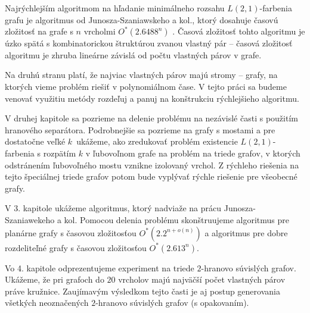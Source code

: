 Najrýchlejším algoritmom na hľadanie minimálneho rozsahu $L(2,1)$-farbenia grafu
je algoritmus od Junosza-Szaniawskeho a kol., ktorý dosahuje časovú zložitosť
na grafe s $n$ vrcholmi $O^*(2.6488^n)$ \cite{junosza_fast}. Časová zložitosť tohto algoritmu je úzko spätá
s kombinatorickou štruktúrou zvanou vlastný pár -- časová zložitosť algoritmu je
zhruba lineárne závislá od počtu vlastných párov v grafe.

Na druhú stranu platí, že najviac vlastných párov majú stromy -- grafy, na ktorých
vieme problém riešiť v polynomiálnom čase. V tejto práci sa budeme venovať využitiu
metódy rozdeľuj a panuj na konštrukciu rýchlejšieho algoritmu.

V druhej kapitole sa pozrieme na delenie problému na nezávislé časti s použitím
hranového separátora. Podrobnejšie sa pozrieme na grafy s mostami a pre dostatočne
veľké $k$ ukážeme, ako zredukovať problém existencie $L(2,1)$-farbenia s rozpätím $k$
v ľubovoľnom grafe na problém na triede grafov, v ktorých odstránením ľubovoľného mostu vznikne izolovaný
vrchol. Z rýchleho riešenia na tejto špeciálnej triede grafov potom bude vyplývať
rýchle riešenie pre všeobecné grafy.

V 3. kapitole ukážeme algoritmus, ktorý nadviaže na prácu Junosza-Szaniawekeho a kol.
Pomocou delenia problému skonštruujeme algoritmus pre planárne grafy s časovou
zložitosťou $O^*(2.2^{n+ o(n)})$ a algoritmus pre dobre rozdeliteľné grafy s časovou
zložitosťou $O^*(2.613^n)$.

Vo 4. kapitole odprezentujeme experiment na triede $2$-hranovo súvislých grafov.
Ukážeme, že pri grafoch do $20$ vrcholov majú najväčší počet vlastných párov
práve kružnice. Zaujímavým výsledkom tejto časti je aj postup generovania všetkých
neoznačených $2$-hranovo súvislých grafov (s opakovaním).
